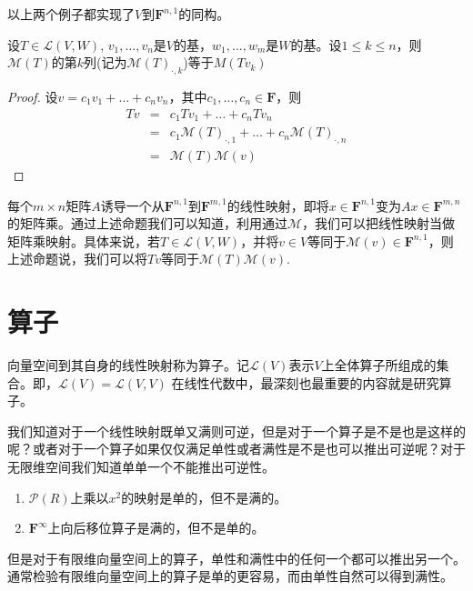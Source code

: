 \documentclass[10pt,a4paper,UTF8]{article}
\begin{document}
以上两个例子都实现了\(V\)到\(\mathbf{F}^{n,1}\)的同构。

\begin{theorem}
设\(T\in \mathcal{L}(V,W)\), \(v_{1},\ldots ,v_{n}\)是\(V\)的基，\(w_{1},\ldots ,w_{m}\)是\(W\)的基。设\(1\leq k \leq n\)，则\(\mathcal{M}(T)\)的第\(k\)列(记为\(\mathcal{M}(T)_{\cdot,k}\))等于\(M(Tv_{k})\)
\end{theorem}

\begin{proof}
设\(v=c_{1}v_{1} + \ldots + c_{n}v_{n}\)，其中\(c_{1},\ldots ,c_{n}\in \mathbf{F}\)，则
\begin{eqnarray}
\label{eq:201703254}
Tv &=& c_{1}Tv_{1} + \ldots + c_{n}Tv_{n} \\
&=& c_{1} \mathcal{M}(T)_{\cdot,1} + \ldots + c_{n} \mathcal{M}(T)_{\cdot,n} \\
&=& \mathcal{M}(T)\mathcal{M}(v)
\end{eqnarray}
\end{proof}
每个\(m\times n\)矩阵\(A\)诱导一个从\(\mathbf{F}^{n,1}\)到\(\mathbf{F}^{m,1}\)的线性映射，即将\(x\in \mathbf{F}^{n,1}\)变为\(Ax\in \mathbf{F}^{m,n}\)的矩阵乘。通过上述命题我们可以知道，利用通过\(\mathcal{M}\)，我们可以把线性映射当做矩阵乘映射。具体来说，若\(T\in \mathcal{L}(V,W)\)，并将\(v\in V\)等同于\(\mathcal{M}(v)\in \mathbf{F}^{n,1}\)，则上述命题说，我们可以将\(Tv\)等同于\(\mathcal{M}(T) \mathcal{M}(v)\).

\section{算子}
\label{sec:org50aa424}


向量空间到其自身的线性映射称为算子。记\(\mathcal{L}(V)\)表示\(V\)上全体算子所组成的集合。即，\(\mathcal{L}(V) = \mathcal{L}(V,V)\) 在线性代数中，最深刻也最重要的内容就是研究算子。

我们知道对于一个线性映射既单又满则可逆，但是对于一个算子是不是也是这样的呢？或者对于一个算子如果仅仅满足单性或者满性是不是也可以推出可逆呢？对于无限维空间我们知道单单一个不能推出可逆性。

\begin{enumerate}
\item \(\mathcal{P}(R)\)上乘以\(x^{2}\)的映射是单的，但不是满的。
\item \(\mathbf{F}^{\infty}\)上向后移位算子是满的，但不是单的。
\end{enumerate}

但是对于有限维向量空间上的算子，单性和满性中的任何一个都可以推出另一个。通常检验有限维向量空间上的算子是单的更容易，而由单性自然可以得到满性。
\end{document}
